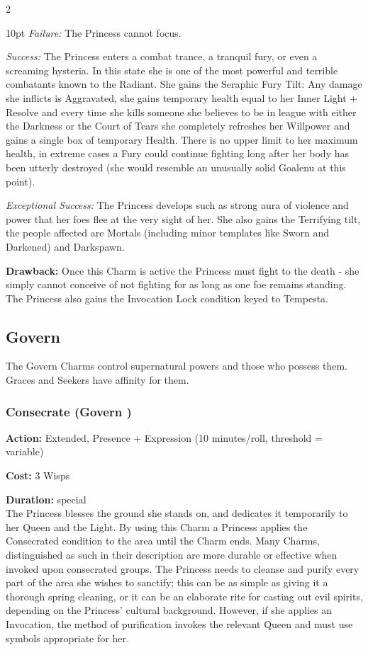 \begin{multicols}{2}
\begin{myindentpar}{10pt}
    \emph{Failure:} The Princess cannot focus.

    \emph{Success:} The Princess enters a combat trance, a tranquil fury, or even a screaming hysteria. In this state she is one of the most powerful and terrible combatants known to the Radiant. She gains the Seraphic Fury Tilt: Any damage she inflicts is Aggravated, she gains temporary health equal to her Inner Light + Resolve and every time she kills someone she believes to be in league with either the Darkness or the Court of Tears she completely refreshes her Willpower and gains a single box of temporary Health. There is no upper limit to her maximum health, in extreme cases a Fury could continue fighting long after her body has been utterly destroyed (she would resemble an unusually solid Goalenu at this point). 

    \emph{Exceptional Success:} The Princess develops such as strong aura of violence and power that her foes flee at the very sight of her. She also gains the Terrifying tilt, the people affected are Mortals (including minor templates like Sworn and Darkened) and Darkspawn.\end{myindentpar}

\textbf{Drawback:} Once this Charm is active the Princess must fight to the death - she simply cannot conceive of not fighting for as long as one foe remains standing. The Princess also gains the Invocation Lock condition keyed to Tempesta.

\subsection*{Govern}
\label{subsec:Govern}
The Govern Charms control supernatural powers and those who possess them. Graces and Seekers have affinity for them.

\subsubsection*{Consecrate (Govern \textbullet)}

\noindent \textbf{Action:} Extended, Presence + Expression (10 minutes/roll, threshold = variable)

\noindent \textbf{Cost:} 3 Wisps

\noindent \textbf{Duration:} special\\

\noindent The Princess blesses the ground she stands on, and dedicates it temporarily to her Queen and the Light. By using this Charm a Princess applies the Consecrated condition to the area until the Charm ends. Many Charms, distinguished as such in their description are more durable or effective when invoked upon consecrated groups. The Princess needs to cleanse and purify every part of the area she wishes to sanctify; this can be as simple as giving it a thorough spring cleaning, or it can be an elaborate rite for casting out evil spirits, depending on the Princess' cultural background. However, if she applies an Invocation, the method of purification invokes the relevant Queen and must use symbols appropriate for her. 


\end{multicols}
